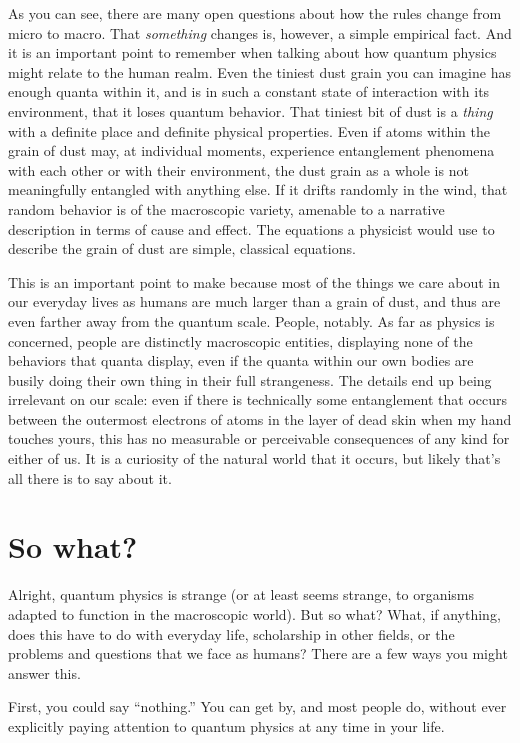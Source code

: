 \documentclass[12pt,onecolumn,preprintnumbers,amsmath,amssymbn,reprint,nofootinbib,superscriptaddress]{revtex4}    %
\begin{document}
As you can see, there are many open questions about how the rules change from micro to macro.  That {\em something } changes is, however, a simple empirical fact. And it is an important point to remember when talking about how quantum physics might relate to the human realm.  Even the tiniest dust grain you can imagine has enough quanta within it, and is in such a constant state of interaction with its environment, that it loses quantum behavior.  That tiniest bit of dust is a {\em thing} with a definite place and definite physical properties.  Even if atoms within the grain of dust may, at individual moments, experience entanglement phenomena with each other or with their environment, the dust grain as a whole is not meaningfully entangled with anything else. If it drifts randomly in the wind, that random behavior is of the macroscopic variety, amenable to a narrative description in terms of cause and effect.  The equations a physicist would use to describe the grain of dust are simple, classical equations.

This is an important point to make because most of the things we care about in our everyday lives as humans are much larger than a grain of dust, and thus are even farther away from the quantum scale.  People, notably.  As far as physics is concerned, people are distinctly macroscopic entities, displaying none of the behaviors that quanta display, even if the quanta within our own bodies are busily doing their own thing in their full strangeness.  The details end up being irrelevant on our scale:  even if there is technically some entanglement that occurs between the outermost electrons of atoms in the layer of dead skin when my hand touches yours, this has no measurable or perceivable consequences of any kind for either of us.  It is a curiosity of the natural world that it occurs, but likely that's all there is to say about it.   

\section{So what?}

Alright, quantum physics is strange (or at least seems strange, to organisms adapted to function in the macroscopic world).  But so what?  What, if anything, does this have to do with everyday life, scholarship in other fields, or the problems and questions that we face as humans? There are a few ways you might answer this. 

First, you could say ``nothing.''  You can get by, and most people do, without ever explicitly paying attention to quantum physics at any time in your life.  
\end{document}

